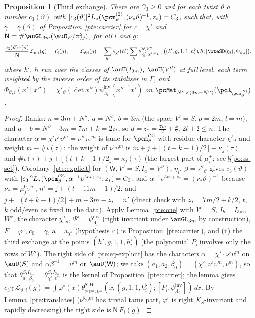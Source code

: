 \documentclass[10pt]{amsart}
\newtheorem{proposition}[theorem]{Proposition}
\theoremstyle{definition}
\theoremstyle{remark}
\begin{document}
\begin{proposition}[Third exchange]\label{pte:third}
There are $C_3\ge0$ and for each twist $\vartheta$ a number $c_3(\vartheta)$ with $|c_3(\vartheta)|^2L_*(\pcm^{(2)}_\vartheta,
(\nu_*\vartheta)^{-1},z_*)=C_3$, such that, with $\gamma=\gamma(\vartheta)$ of Proposition~\ref{pte:carrier} for
$c=\chi'$ and $\mathsf N=\#\auGL_{3m}(\auO_E/\pi_M^2)$, for all $i$ and $g$:
\[
\frac{c_3(\vartheta)\gamma(\vartheta)}{\mathsf N}\,\mathcal L_{\vartheta,i}(g)=F_i(g),\qquad
\mathcal L_{\vartheta,i}(g)=\sum_{h'}\mathrm a_{\chi'}(h')\sum_{h}\theta^{\mathsf W,V''}_{\nu''_\vartheta,\,\chi'\nu^\flat
\upsilon^m}\bigl((h',g,1,1,h^\flat_i),h;[\pteSD(\eta_i),\Phi_{\vartheta,i}]\bigr),
\]
where $h'$, $h$ run over the classes of $\auU(I_{3m})$, $\auU(V'')$ at full level, each term weighted by the
inverse order of its stabiliser in $\Gamma$, and $\Phi_{\vartheta,i}(x'\mid x'')=\chi'_\vartheta(\det x'')\psi^{\mathrm{inv}}_{
\Lambda_i}(x''^{-1}x')$ on $\pcMat_{N''\times(3m+N'')}(\pcR_{\pcm^{(2)}_\vartheta})$.
\end{proposition}
\begin{proof}
Ranks: $n=3m+N''$, $a=N''$, $b=3m$ (the space $V'=S$, $p=2m$, $l=m$), and $a-b=N''-3m=7m+k=2z_*$, so
$d=z_*=\tfrac{7m}2+\tfrac k2$; $2l+2\le n$. The character $\alpha=\chi'\nu^\flat\upsilon^m=\nu''_\vartheta\upsilon^m$ is tame
for $\pcm^{(2)}_\vartheta$ with residue character $\chi'_\vartheta$ and weight $m-\#\iota(\tau)$: the weight of $\nu^\flat\upsilon^m$
is $m+j+\lfloor(t+k-1)/2\rfloor-\kappa_j(\tau)$ and $\#\iota(\tau)+j+\lfloor(t+k-1)/2\rfloor=\kappa_j(\tau)$ (the largest part
of $\mu^+_\tau$; see \S\ref{po:ss-set}). Corollary~\ref{pte:explicit} for $(\mathsf W,V'=S,I_a=V'')$, $\eta_i$,
$\beta=\nu''_\vartheta$ gives $c_3(\vartheta)$ with $|c_3|^2L_*(\pcm^{(2)}_\vartheta,\alpha^{-1}\upsilon^{3m+z_*},z_*)=C_3$; and
$\alpha^{-1}\upsilon^{3m+z_*}=(\nu_*\vartheta)^{-1}$ because $\nu_*=\mu_j^0\upsilon^{n'}$, $n'=j+(t-11m-1)/2$, and
$j+\lfloor(t+k-1)/2\rfloor+m-3m-z_*=n'$ (direct check with $z_*=7m/2+k/2$, $t$, $k$ odd/even as fixed in the data).
Apply Lemma~\ref{pte:one} with $V'=S$, $I_b=I_{3m}$, $W'$, the character $\chi'_\vartheta$, $\Psi'=\psi^{\mathrm{inv}}_{\Lambda_i}$
(right invariant under $\auGL_{3m}$ by construction), $F=\varphi^\circ$, $c_0=\gamma$, $\mathrm a=\mathrm a_{\chi'}$
(hypothesis (i) is Proposition~\ref{pte:carrier}), and (ii) the third exchange at the points
$(h',g,1,1,h^\flat_i)$ (the polynomial $P_i$ involves only the rows of $W'$). The right side of
\eqref{pte:eq-explicit} has the characters $\alpha=\chi'\cdot\nu^\flat\upsilon^m$ on $\auU(S)$ and
$\alpha\beta^{-1}=\upsilon^m$ on $\auU(\mathsf W)$; we take $(a_1,a_2,\beta_0)=(\chi',\nu^\flat\upsilon^m,\upsilon^m)$, so that
$\theta^{S,I_{3m}}_{a_1,\beta_0}=\theta^{S,I_{3m}}_{\chi',\upsilon^m}$ is the kernel of Proposition~\ref{pte:carrier}; the lemma gives
$c_3\gamma\,\mathcal L_{\vartheta,i}(g)=\int\varphi^\circ(x)\theta^{S,W'}_{\nu^\flat\upsilon^m,\upsilon^m}(x,(g,1,1,h^\flat_i);
[P_i,\psi^{\mathrm{inv}}_{\Lambda_i}])\,dx$. By Lemma~\ref{pte:translates} ($\nu^\flat\upsilon^m$ has trivial tame part,
$\varphi^\circ$ is right $K_S$-invariant and rapidly decreasing) the right side is $\mathsf N\,F_i(g)$.
\end{proof}
\end{document}
